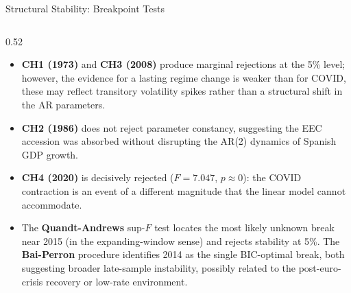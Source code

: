 \documentclass[9pt]{beamer}
\begin{document}
\begin{frame}{Structural Stability: Breakpoint Tests}
\begin{columns}
  \begin{column}{0.52\textwidth}
    \footnotesize
    \begin{itemize}
      \item \textbf{CH1 (1973)} and \textbf{CH3 (2008)} produce marginal rejections at the 5\% level; however, the evidence for a lasting regime change is weaker than for COVID, these may reflect transitory volatility spikes rather than a structural shift in the AR parameters.
      \item \textbf{CH2 (1986)} does not reject parameter constancy, suggesting the EEC accession was absorbed without disrupting the AR(2) dynamics of Spanish GDP growth.
      \item \textbf{CH4 (2020)} is decisively rejected ($F=7.047$, $p\approx 0$): the COVID contraction is an event of a different magnitude that the linear model cannot accommodate.
      \item The \textbf{Quandt-Andrews} sup-$F$ test locates the most likely unknown break near 2015 (in the expanding-window sense) and rejects stability at 5\%. The \textbf{Bai-Perron} procedure identifies 2014 as the single BIC-optimal break, both suggesting broader late-sample instability, possibly related to the post-euro-crisis recovery or low-rate environment.
    \end{itemize}
  \end{column}
\end{columns}

\end{frame}
\end{document}
